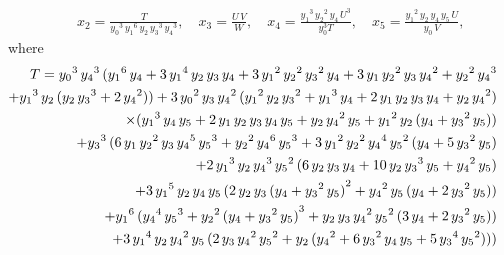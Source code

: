 \begin{pro}
\begin{eqnarray*}
&&x_2=\frac{T}{{{y_0}}^3\,
    {{y_1}}^6\,{y_2}\,{{y_3}}^3\,{{y_4}}^3},{\quad}
x_3=\frac{U\,V}{W},{\quad}
x_4=\frac{{{y_1}}^3\,{{y_2}}^2\,{y_4}\,  {U }^3}{y_0^3T},{\quad}
x_5=\frac{{{y_1}}^2\,{y_2}\,{y_4}\,{y_5}\,U }
{{y_0}\,V},
\end{eqnarray*}
where
\begin{eqnarray*}
&&\hspace{-30pt}
T={{y_0}}^3\,{{y_4}}^3\,( {{y_1}}^6\,{y_4} + 
       3\,{{y_1}}^4\,{y_2}\,{y_3}\,{y_4} + 
       3\,{{y_1}}^2\,{{y_2}}^2\,{{y_3}}^2\,{y_4} + 
       3\,{y_1}\,{{y_2}}^2\,{y_3}\,{{y_4}}^2 + 
     {{y_2}}^2\,{{y_4}}^3 \\
&&\hspace{-20pt}+ {{y_1}}^3\,{y_2}\,( {y_2}\,
{{y_3}}^3 + 2\,{{y_4}}^2 ) ) 
 + 3\,{{y_0}}^2\,{y_3}\,{{y_4}}^2\,
 ( {{y_1}}^2\,{y_2}\,{{y_3}}^2 
+ {{y_1}}^3\,{y_4} + 2\,{y_1}\,{y_2}\,{y_3}\,{y_4} 
+ {y_2}\,{{y_4}}^2 ) \\
&&\hspace{-20pt}\times ( {{y_1}}^3\,{y_4}\,{y_5} + 
       2\,{y_1}\,{y_2}\,{y_3}\,{y_4}\,{y_5}
 +   {y_2}\,{{y_4}}^2\,{y_5} + 
  {{y_1}}^2\,{y_2}\,( {y_4} + {{y_3}}^2\,{y_5} )  ) \\
&&\hspace{-20pt}+ {{y_3}}^3\,( 6\,{y_1}\,
{{y_2}}^2\,{y_3}\,{{y_4}}^5\,
        {{y_5}}^3 + {{y_2}}^2\,{{y_4}}^6\,{{y_5}}^3 
+ 3\,{{y_1}}^2\,{{y_2}}^2\,{{y_4}}^4\,{{y_5}}^2\,
        ( {y_4} + 5\,{{y_3}}^2\,{y_5} ) \\
&&\hspace{-20pt}
 + 2\,{{y_1}}^3\,{y_2}\,{{y_4}}^3\,{{y_5}}^2\,
  ( 6\,{y_2}\,{y_3}\,{y_4} +   
10\,{y_2}\,{{y_3}}^3\,{y_5} + {{y_4}}^2\,{y_5} )\\
&&\hspace{-20pt}
+  3\,{{y_1}}^5\,{y_2}\,{y_4}\,{y_5}\,
        ( 2\,{y_2}\,{y_3}\,
    {( {y_4} + {{y_3}}^2\,{y_5} ) }^2 
+ {{y_4}}^2\,{y_5}\,( {y_4} + 2\,{{y_3}}^2\,{y_5} ))\\
&&\hspace{-20pt}
  + {{y_1}}^6\,( {{y_4}}^4\,{{y_5}}^3 + 
      {{y_2}}^2\,{( {y_4} + {{y_3}}^2\,{y_5} ) }^3
+ {y_2}\,{y_3}\,{{y_4}}^2\,{{y_5}}^2\,
           ( 3\,{y_4} + 2\,{{y_3}}^2\,{y_5} )  ) \\
&&\hspace{-20pt}
 +  3\,{{y_1}}^4\,{y_2}\,{{y_4}}^2\,{y_5}\,
        ( 2\,{y_3}\,{{y_4}}^2\,{{y_5}}^2 + 
   {y_2}\,( {{y_4}}^2 + 6\,{{y_3}}^2\,{y_4}\,{y_5} + 
             5\,{{y_3}}^4\,{{y_5}}^2 ))) \\
&&\hspace{-20pt}

\end{eqnarray*}
\end{pro}
